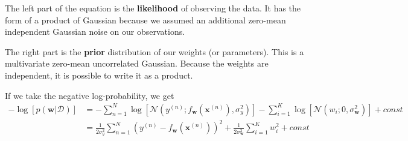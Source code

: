 The left part of the equation is the \textbf{likelihood} of observing the data. It has the form of a product of Gaussian because we assumed an additional zero-mean independent Gaussian noise on our observations.

The right part is the \textbf{prior} distribution of our weights (or parameters). This is a multivariate zero-mean uncorrelated Gaussian. Because the weights are independent, it is possible to write it as a product.

If we take the negative log-probability, we get
\begin{align}
    -\log[p(\mathbf{w}|\mathcal{D})] & = -\sum_ {n=1}^{N} \log[\mathcal{N}(y^{(n)}; f_{\mathbf{w}}(\mathbf{x}^{(n)}), \sigma_y^2)] - \sum_{i=1}^K \log[\mathcal{N}(w_i; 0, \sigma_{\mathbf{w}}^2)] + const \\
    & = \frac{1}{2\sigma_y^2} \sum_{n=1}^N (y^{(n)} - f_{\mathbf{w}}(\mathbf{x}^{(n)}))^2 + \frac{1}{2\sigma_{\mathbf{w}}^2} \sum_{i=1}^K w_i^2 + const
\end{align}